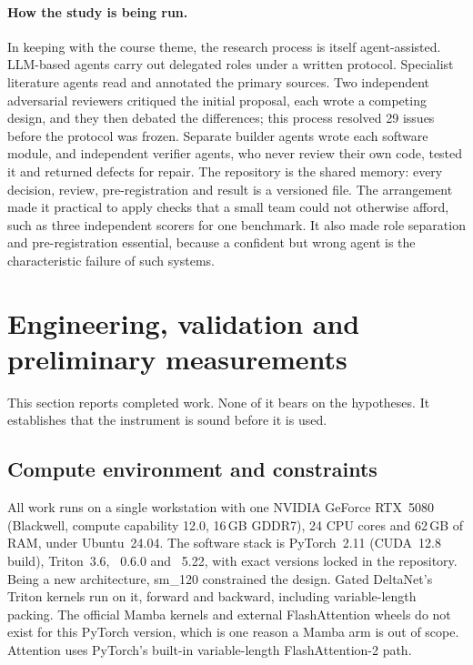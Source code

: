 \documentclass[10pt,a4paper]{article}
\begin{document}
\paragraph{How the study is being run.}
In keeping with the course theme, the research process is itself agent-assisted. LLM-based agents
carry out delegated roles under a written protocol. Specialist literature agents read and annotated
the primary sources. Two independent adversarial reviewers critiqued the initial proposal, each wrote
a competing design, and they then debated the differences; this process resolved 29 issues before
the protocol was frozen. Separate builder agents wrote each software module, and independent verifier
agents, who never review their own code, tested it and returned defects for repair. The repository is
the shared memory: every decision, review, pre-registration and result is a versioned file.
The arrangement made it practical to apply checks that a small team could not otherwise afford,
such as three independent scorers for one benchmark. It also made role separation and
pre-registration essential, because a confident but wrong agent is the characteristic failure of
such systems.

\section{Engineering, validation and preliminary measurements}\label{sec:validation}

This section reports completed work. None of it bears on the hypotheses. It establishes that the
instrument is sound before it is used.

\subsection{Compute environment and constraints}\label{sec:env}
All work runs on a single workstation with one NVIDIA GeForce RTX~5080 (Blackwell, compute capability
12.0, 16\,GB GDDR7), 24 CPU cores and 62\,GB of RAM, under Ubuntu~24.04. The software stack is
PyTorch~2.11 (CUDA~12.8 build), Triton~3.6, ~0.6.0 and
~5.22, with exact versions locked in the repository. Being a new architecture,
sm\_120 constrained the design. Gated DeltaNet's Triton kernels run on it, forward and backward,
including variable-length packing. The official Mamba kernels and external FlashAttention wheels do
not exist for this PyTorch version, which is one reason a Mamba arm is out of scope. Attention uses
PyTorch's built-in variable-length FlashAttention-2 path.
\end{document}
